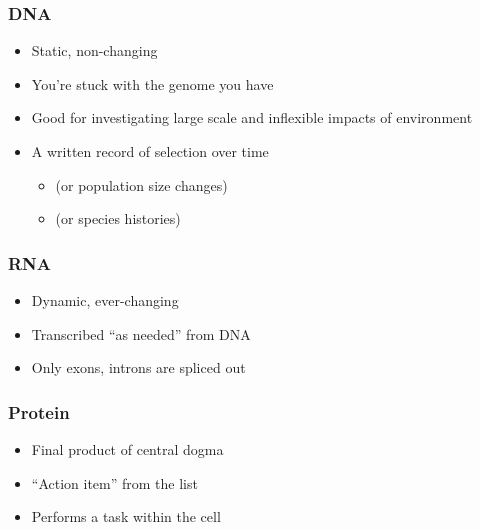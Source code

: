 \documentclass[14pt]{beamer}
\begin{document}
\begin{frame}
\frametitle{DNA}
	\begin{itemize}
		\item<+-> Static, non-changing
		\item<+-> You're stuck with the genome you have
		\item<+-> Good for investigating large scale and inflexible impacts of environment
		\item<+-> A written record of selection over time
		\begin{itemize}
			\item (or population size changes)
			\item (or species histories) 
		\end{itemize}
	\end{itemize}
\end{frame}

\begin{frame}
\frametitle{RNA}
	\begin{itemize}
		\item<+-> Dynamic, ever-changing
		\item<+-> Transcribed ``as needed'' from DNA
		\item<+-> Only exons, introns are spliced out
	\end{itemize}
\end{frame}

\begin{frame}
\frametitle{Protein}
	\begin{itemize}
		\item<+-> Final product of central dogma
		\item<+-> ``Action item'' from the list
		\item<+-> Performs a task within the cell
	\end{itemize}
\end{frame}
\end{document}
